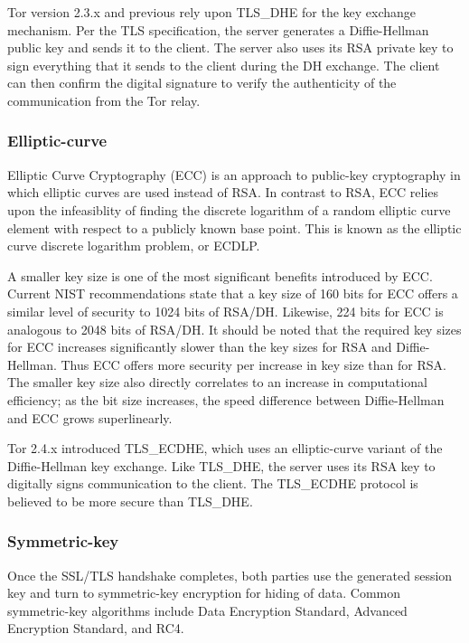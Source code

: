 \documentclass[journal]{IEEEtran}
\begin{document}
Tor version 2.3.x and previous rely upon TLS\_DHE for the key exchange mechanism. Per the TLS specification, the server generates a Diffie-Hellman public key and sends it to the client. The server also uses its RSA private key to sign everything that it sends to the client during the DH exchange. The client can then confirm the digital signature to verify the authenticity of the communication from the Tor relay.

\subsubsection{Elliptic-curve}

Elliptic Curve Cryptography (ECC) is an approach to public-key cryptography in which elliptic curves are used instead of RSA. In contrast to RSA, ECC relies upon the infeasiblity of finding the discrete logarithm of a random elliptic curve element with respect to a publicly known base point. This is known as the elliptic curve discrete logarithm problem, or ECDLP.

A smaller key size is one of the most significant benefits introduced by ECC. Current NIST recommendations state that a key size of 160 bits for ECC offers a similar level of security to 1024 bits of RSA/DH. Likewise, 224 bits for ECC is analogous to 2048 bits of RSA/DH. It should be noted that the required key sizes for ECC increases significantly slower than the key sizes for RSA and Diffie-Hellman. Thus ECC offers more security per increase in key size than for RSA. The smaller key size also directly correlates to an increase in computational efficiency; as the bit size increases, the speed difference between Diffie-Hellman and ECC grows superlinearly.\cite{CaseForECC}

Tor 2.4.x introduced TLS\_ECDHE, which uses an elliptic-curve variant of the Diffie-Hellman key exchange. Like TLS\_DHE, the server uses its RSA key to digitally signs communication to the client. The TLS\_ECDHE protocol is believed to be more secure than TLS\_DHE.

\subsubsection{Symmetric-key}


Once the SSL/TLS handshake completes, both parties use the generated session key and turn to symmetric-key encryption for hiding of data. Common symmetric-key algorithms include Data Encryption Standard, Advanced Encryption Standard, and RC4.
\end{document}
